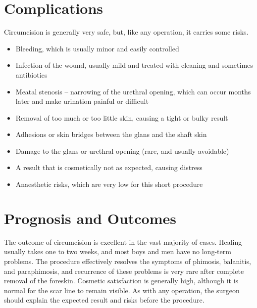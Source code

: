 \section*{Complications}
Circumcision is generally very safe, but, like any operation, it carries some risks.

\begin{itemize}
    \item Bleeding, which is usually minor and easily controlled
    \item Infection of the wound, usually mild and treated with cleaning and sometimes antibiotics
    \item Meatal stenosis -- narrowing of the urethral opening, which can occur months later and make urination painful or difficult
    \item Removal of too much or too little skin, causing a tight or bulky result
    \item Adhesions or skin bridges between the glans and the shaft skin
    \item Damage to the glans or urethral opening (rare, and usually avoidable)
    \item A result that is cosmetically not as expected, causing distress
    \item Anaesthetic risks, which are very low for this short procedure
\end{itemize}

\section*{Prognosis and Outcomes}
The outcome of circumcision is excellent in the vast majority of cases. Healing usually takes one to two weeks, and most boys and men have no long-term problems. The procedure effectively resolves the symptoms of phimosis, balanitis, and paraphimosis, and recurrence of these problems is very rare after complete removal of the foreskin. Cosmetic satisfaction is generally high, although it is normal for the scar line to remain visible. As with any operation, the surgeon should explain the expected result and risks before the procedure.

